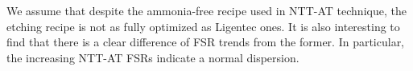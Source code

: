 We assume that despite the ammonia-free recipe used in NTT-AT technique, the etching recipe is not as fully optimized as Ligentec ones. It is also interesting to find that there is a clear difference of FSR trends from the former. In particular, the increasing NTT-AT FSRs indicate a normal dispersion.

%    

%    

